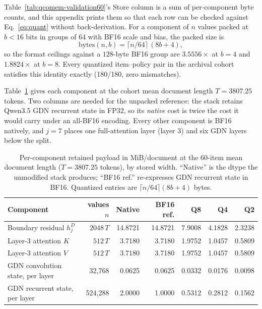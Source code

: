 \documentclass{article}
\begin{document}
Table~\ref{tab:qcomem-validation60}'s Store column is a sum of per-component
byte counts, and this appendix prints them so that each row can be checked
against Eq.~\ref{eq:quant} without back-derivation.  For a component of $n$ values packed at
$b<16$ bits in groups of 64 with BF16 scale and bias, the packed size is
\begin{equation*}
  \mathrm{bytes}(n,b)=\lceil n/64\rceil\,(8b+4),
\end{equation*}
so the format ceilings against a $128$-byte BF16 group are $3.5556\times$ at
$b=4$ and $1.8824\times$ at $b=8$.  Every quantized item--policy pair in the
archival cohort satisfies this identity exactly (180/180, zero mismatches).

Table~\ref{tab:store-components} gives each component at the cohort mean
document length $T=3807.25$ tokens.  Two columns are needed for the unpacked
reference: the stack retains Qwen3.5 GDN recurrent state in FP32, so its
\emph{native} cost is twice the cost it would carry under an all-BF16 encoding.
Every other component is BF16 natively, and $j=7$ places one full-attention
layer (layer 3) and six GDN layers below the split.

\begin{table}[H]
  \caption{Per-component retained payload in MiB/document at the 60-item mean
document length ($T=3807.25$ tokens), by stored width.  ``Native'' is the dtype
the unmodified stack produces; ``BF16 ref.'' re-expresses GDN recurrent state
in BF16.  Quantized entries are $\lceil n/64\rceil(8b+4)$ bytes.}
  \label{tab:store-components}
  \centering\small
  \begin{tabular}{@{}lrrrrrr@{}}
    \toprule
    Component & values $n$ & Native & BF16 ref. & Q8 & Q4 & Q2 \\
    \midrule
    Boundary residual $h_j^D$ & $2048\,T$ & 14.8721 & 14.8721 & 7.9008 & 4.1828 & 2.3238 \\
    Layer-3 attention $K$ & $512\,T$ & 3.7180 & 3.7180 & 1.9752 & 1.0457 & 0.5809 \\
    Layer-3 attention $V$ & $512\,T$ & 3.7180 & 3.7180 & 1.9752 & 1.0457 & 0.5809 \\
    GDN convolution state, per layer & 32{,}768 & 0.0625 & 0.0625 & 0.0332 & 0.0176 & 0.0098 \\
    GDN recurrent state, per layer & 524{,}288 & 2.0000 & 1.0000 & 0.5312 & 0.2812 & 0.1562 \\
    \bottomrule
  \end{tabular}
\end{table}
\end{document}
